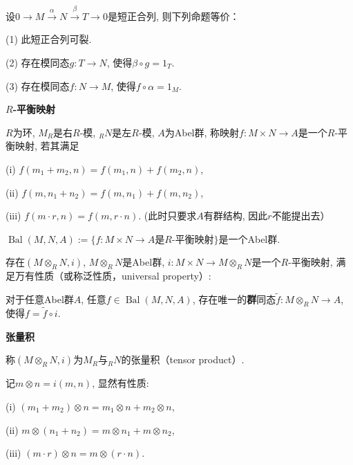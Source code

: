 \begin{theorem}
    设$0\rightarrow M \xrightarrow{\alpha} N \xrightarrow{\beta} T \rightarrow 0$是短正合列, 则下列命题等价：\par
    \qquad (1) 此短正合列可裂.\par
    \qquad (2) 存在模同态$g:T\rightarrow N$, 使得$\beta \circ g=1_T$.\par
    \qquad (3) 存在模同态$f:N\rightarrow M$, 使得$f\circ \alpha=1_M$.
\end{theorem}

\begin{definition}  \textbf{$R$-平衡映射}\par
    \qquad $R$为环, $M_R$是右$R$-模, $_RN$是左$R$-模, $A$为Abel群, 
    称映射$f:M\times N \rightarrow A$是一个$R$-平衡映射, 若其满足\par
    \qquad (i) $f(m_1+m_2,n)=f(m_1,n)+f(m_2,n)$,\par
    \qquad (ii) $f(m,n_1+n_2)=f(m,n_1)+f(m,n_2)$,\par
    \qquad (iii) $f(m\cdot r,n)=f(m,r\cdot n)$. (此时只要求$A$有群结构, 因此$r$不能提出去）\par
    \qquad $\operatorname{Bal}(M,N,A):=\{f:M\times N\rightarrow A$是$R$-平衡映射$\!\}$是一个Abel群.
\end{definition}

\begin{proposition}
    存在$(M \otimes_R N,i)$, $M \otimes_R N$是Abel群, 
    $i:M\times N\rightarrow M\otimes_R N$是一个$R$-平衡映射, 
    满足万有性质（或称泛性质，universal property）:\par
    \qquad 对于任意Abel群$A$, 任意$f\in \operatorname{Bal}(M,N,A)$, 
    存在唯一的\textbf{群}同态$\tilde{f}:M\otimes_R N\rightarrow A$, 
    使得$f=\tilde{f}\circ i$.

\end{proposition}

\begin{definition}  \textbf{张量积}\par
    \qquad 称$(M \otimes_R N,i)$为$M_R$与$_RN$的张量积（tensor product）.\par
    \qquad 记$m\otimes n=i(m,n)$, 显然有性质:\par
    \qquad \qquad (i) $(m_1+m_2)\otimes n=m_1\otimes n+m_2\otimes n$,\par
    \qquad \qquad (ii) $m\otimes (n_1+n_2)=m\otimes n_1+m\otimes n_2$,\par
    \qquad \qquad (iii) $(m\cdot r)\otimes n=m \otimes (r\cdot n)$.
\end{definition}

